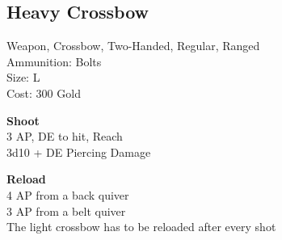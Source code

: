 \subsection{Heavy Crossbow}\label{weapon:heavyCrossbow}
Weapon, Crossbow, Two-Handed, Regular, Ranged\\
Ammunition: Bolts\\
Size: L\\
Cost: 300 Gold

\textbf{Shoot} \\
3 AP, DE to hit,  Reach\\
3d10 + \texttimes DE Piercing Damage

\textbf{Reload} \\
4 AP from a back quiver\\
3 AP from a belt quiver\\
The light crossbow has to be reloaded after every shot

